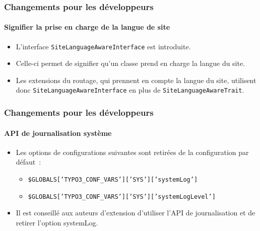 
\begin{frame}[fragile]
	\frametitle{Changements pour les développeurs}
	\framesubtitle{Signifier la prise en charge de la langue de site}

	\lstset{basicstyle=\tiny\ttfamily}


	\begin{itemize}
		\item L'interface \texttt{SiteLanguageAwareInterface} est introduite.
		\item Celle-ci permet de signifier qu'un classe prend en charge la langue du site.
		\item Les extensions du routage, qui prennent en compte la langue du site,
			utilisent donc \texttt{SiteLanguageAwareInterface}
			en plus de \texttt{SiteLanguageAwareTrait}.
	\end{itemize}

\end{frame}


\begin{frame}[fragile]
	\frametitle{Changements pour les développeurs}
	\framesubtitle{API de journalisation système}

	\lstset{basicstyle=\tiny\ttfamily}

	\begin{itemize}
		\item Les options de configurations suivantes sont retirées de la configuration par défaut~:

			\begin{itemize}\smaller
				\item \texttt{\$GLOBALS['TYPO3\_CONF\_VARS']['SYS']['systemLog']}
				\item \texttt{\$GLOBALS['TYPO3\_CONF\_VARS']['SYS']['systemLogLevel']}
			\end{itemize}\normalsize

		\item Il est conseillé aux auteurs d'extension d'utiliser l'API de journalisation et de retirer
			l'option systemLog.
	\end{itemize}

\end{frame}

